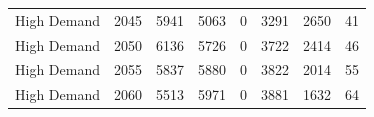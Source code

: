 \documentclass[preprint,12pt]{elsarticle}
\begin{document}
\begin{table}[h]
\begin{tabular}{llllllll}
    High Demand                           & 2045                              & 5941                                                                                             & 5063                                                                                             & 0                                                                                                  & 3291                                                                                                               & 2650                                                                                                          & 41                                                                                            \\
    High Demand                           & 2050                              & 6136                                                                                             & 5726                                                                                             & 0                                                                                                  & 3722                                                                                                               & 2414                                                                                                          & 46                                                                                            \\
    High Demand                           & 2055                              & 5837                                                                                             & 5880                                                                                             & 0                                                                                                  & 3822                                                                                                               & 2014                                                                                                          & 55                                                                                            \\
    High Demand                           & 2060                              & 5513                                                                                             & 5971                                                                                             & 0                                                                                                  & 3881                                                                                                               & 1632                                                                                                          & 64                                                                                            \\ \hline
    \end{tabular}
\end{table}
\end{document}
